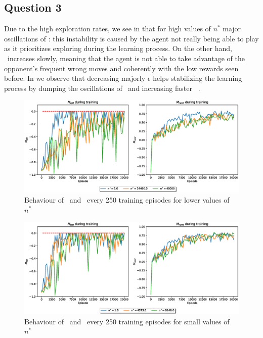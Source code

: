 \documentclass[10pt]{IEEEtran}
\begin{document}
\subsection*{Question 3}
Due to the high exploration rates, we see in  that for high values of $n^{*}$ major oscillations of \mopt: this instability is caused by the agent not really being able to play as it prioritizes exploring during the learning process. On the other hand, \mrand\  increases slowly, meaning that the agent is not able to take advantage of the opponent's frequent wrong moves and coherently with the low rewards seen before. In  we observe that decreasing majorly $\epsilon$ helps stabilizing the learning process by dumping the oscillations of \mopt\  and increasing faster \mrand\ .
\begin{figure}[H]
    \centering
    \includegraphics[width=\linewidth]{code/figures/performance_n_star_first.eps}
    \caption{Behaviour of \mopt\  and \mrand\  every 250 training episodes for lower values of $n^{*}$}
    \label{firstplot_question3}
\end{figure}
\begin{figure}[H]
    \centering
    \includegraphics[width=\linewidth]{code/figures/performance_n_star_second.eps}
    \caption{Behaviour of \mopt\  and \mrand\  every 250 training episodes for small values of $n^{*}$}
    \label{secondplot_question3}
\end{figure}
\end{document}
